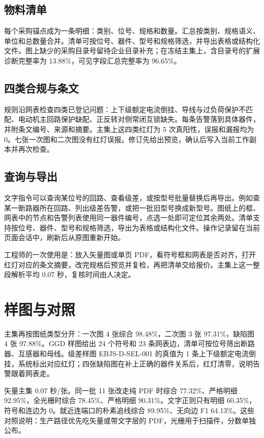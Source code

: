 \subsection{物料清单}
每个采购锚点成为一条明细：类别、位号、规格和数量。汇总按类别、规格语义、单位和总数量合并。清单可按位号、器件、型号和规格筛选，并导出表格或结构化文件。图上缺少的采购目录号留待企业目录补充；在冻结主集上，含目录号的扩展诊断完整率为 13.88\%，可见字段汇总完整率为 96.65\%。

\subsection{四类合规与条文}
规则沿网表检查四类已登记问题：上下级额定电流倒挂、导线与过负荷保护不匹配、电动机主回路保护缺配、正反转对侧常闭互锁缺失。每条告警落到具体器件，并附条文编号、来源和摘要。主集上这四类红灯为 5 次真阳性，误报和漏报均为 0。七张一次图和二次图没有红灯误报。修订先给出预览，确认后写入当前工作副本并再次检查。

\subsection{查询与导出}
文字指令可以查询某位号的回路、查看级差，或按型号批量替换后再导出。例如查某一断路器所在回路、列出级差告警，或把一批旧型号换成新型号。图纸上的框、网表中的节点和告警列表使用同一器件编号，点选一处即可定位其余两处。清单支持按位号、器件、型号和规格筛选，导出为表格或结构化文件。操作记录留在当前页面会话中，刷新后从原图重新开始。

工程师的一次使用是：放入矢量图或单页 PDF，看符号框和网表是否对齐，打开红灯对应的条文摘要，改完规格后预览并复检，再把清单交给报价。主集上这一整段解析平均 0.07 秒，复核时间由人决定。

\section{样图与对照}
主集再按图纸类型分开：一次图 4 张综合 98.48\%，二次图 3 张 97.31\%，缺陷图 4 张 97.88\%。GGD 样图给出 24 个符号和 23 条网表边，清单可按位号筛出断路器、互感器和母线。级差样图 EBJS-D-SEL-001 的真值为 1 条上下级额定电流倒挂，系统标出对应红灯；四张缺陷图在补上正确的器件关系后，红灯清零，说明告警跟着网表走。

矢量主集 0.07 秒/张。同一批 11 张改走纯 PDF 时综合 77.32\%、严格明细 92.95\%，全光栅时综合 78.45\%、严格明细 90.31\%。文字正则只有明细 60.35\%，符号和连边为 0。就近连端口的朴素追线综合 89.95\%、无向边 F1 64.13\%。这些对照说明：生产路径优先吃矢量或带文字层的 PDF，光栅用于扫描件，分数单独公布。

